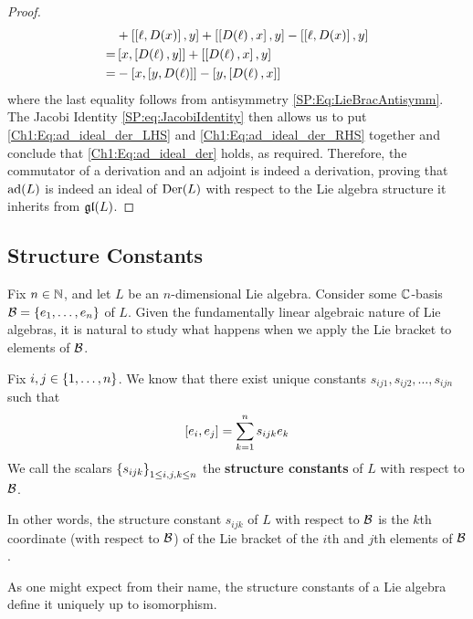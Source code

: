 \begin{proof}
\begin{align}
        &+ \left[ \left[ \ell, D(x) \right], y \right] + \left[ \left[ D\!\left( \ell \right), x \right], y \right] - \left[ \left[ \ell, D\!\left( x \right) \right], y \right] \nonumber \\
        =& \left[ x, \left[ D\!\left( \ell \right), y \right] \right] + \left[ \left[ D\!\left( \ell \right), x \right], y \right] \nonumber \\
        =& -\left[ x, \left[ y, D\!\left( \ell \right) \right] \right] - \left[ y, \left[ D\!\left( \ell \right), x \right] \right] \label{Ch1:Eq:ad_ideal_der_RHS}
    \end{align}
    where the last equality follows from antisymmetry \eqref{SP:Eq:LieBracAntisymm}. The Jacobi Identity \eqref{SP:eq:JacobiIdentity} then allows us to put \eqref{Ch1:Eq:ad_ideal_der_LHS} and \eqref{Ch1:Eq:ad_ideal_der_RHS} together and conclude that \eqref{Ch1:Eq:ad_ideal_der} holds, as required. Therefore, the commutator of a derivation and an adjoint is indeed a derivation, proving that $\operatorname{ad}\!\left( L \right)$ is indeed an ideal of $\operatorname{Der}\!\left( L \right)$ with respect to the Lie algebra structure it inherits from $\mathfrak{gl}\!\left( L \right)$.
\end{proof}

\subsection{Structure Constants}

Fix $n \in \mathbb{N}$, and let $L$ be an $n$-dimensional Lie algebra. Consider some $\mathbb{C}$-basis $\mathcal{B} = \left\{ e_1, \ldots, e_n \right\}$ of $L$. Given the fundamentally linear algebraic nature of Lie algebras, it is natural to study what happens when we apply the Lie bracket to elements of $\mathcal{B}$.

\begin{boxdefinition}\label{Ch1:Def:StructureConstants}
    Fix $i, j \in \left\{ 1, \ldots, n \right\}$. We know that there exist unique constants $s_{ij1}, s_{ij2}, \ldots, s_{ijn}$ such that
    \begin{align*}
        \left[ e_i, e_j \right] = \sum_{k = 1}^{n} s_{ijk} e_k
    \end{align*}
    We call the scalars $\left\{ s_{ijk} \right\}_{1 \leq i, j, k \leq n}$ the \textbf{structure constants} of $L$ with respect to $\mathcal{B}$.
\end{boxdefinition}

In other words, the structure constant $s_{ijk}$ of $L$ with respect to $\mathcal{B}$ is the $k$th coordinate (with respect to $\mathcal{B}$) of the Lie bracket of the $i$th and $j$th elements of $\mathcal{B}$.

As one might expect from their name, the structure constants of a Lie algebra define it uniquely up to isomorphism.

